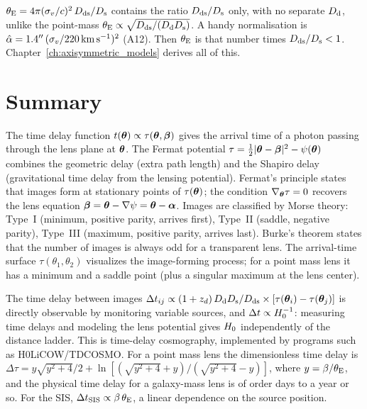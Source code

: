 \begin{annotation}
$\theta_{\mathrm{E}} = 4\pi(\sigma_v/c)^2\,D_{\mathrm{ds}}/D_{\mathrm{s}}$ contains the ratio
$D_{\mathrm{ds}}/D_{\mathrm{s}}$ only, with no separate $D_{\mathrm{d}}$, unlike the point-mass
$\theta_{\mathrm{E}}\propto\sqrt{D_{\mathrm{ds}}/(D_{\mathrm{d}}D_{\mathrm{s}})}$.  A handy normalisation is
$\hat{\alpha} = 1.4''\,(\sigma_v/220\,\mathrm{km\,s^{-1}})^2$
\citep[eq.~44]{narayan_lectures_1997} (A12).  Then $\theta_{\mathrm{E}}$ is that number
times $D_{\mathrm{ds}}/D_{\mathrm{s}}<1$.  Chapter~\ref{ch:axisymmetric_models} derives all of this.
\end{annotation}


\section{Summary}
\label{sec:fermat_summary}

The time delay function $t(\boldsymbol{\theta}) \propto \tau(\boldsymbol{\theta}, \boldsymbol{\beta})$
gives the arrival time of a photon passing through the lens plane at
$\boldsymbol{\theta}$.  The Fermat potential
$\tau = \tfrac{1}{2}|\boldsymbol{\theta} - \boldsymbol{\beta}|^2 - \psi(\boldsymbol{\theta})$ combines the
geometric delay (extra path length) and the Shapiro delay (gravitational
time delay from the lensing potential).  Fermat's principle states that
images form at stationary points of $\tau(\boldsymbol{\theta})$; the condition
$\nabla_{\boldsymbol{\theta}}\tau = 0$ recovers the lens equation
$\boldsymbol{\beta} = \boldsymbol{\theta} - \nabla\psi = \boldsymbol{\theta} - \boldsymbol{\alpha}$.  Images are
classified by Morse theory: Type~I (minimum, positive parity, arrives
first), Type~II (saddle, negative parity), Type~III (maximum, positive
parity, arrives last).  Burke's theorem states that the number of images
is always odd for a transparent lens.  The arrival-time surface
$\tau(\theta_1, \theta_2)$ visualizes the image-forming process; for a
point mass lens it has a minimum and a saddle point (plus a singular
maximum at the lens center).

The time delay between images
$\Delta t_{ij} \propto (1+z_d)\,D_{\mathrm{d}}D_{\mathrm{s}}/D_{\mathrm{ds}} \times
[\tau(\boldsymbol{\theta}_i) - \tau(\boldsymbol{\theta}_j)]$ is directly observable by
monitoring variable sources, and $\Delta t \propto H_0^{-1}$:
measuring time delays and modeling the lens potential gives $H_0$
independently of the distance ladder.  This is time-delay cosmography,
implemented by programs such as H0LiCOW/TDCOSMO.  For a point mass lens
the dimensionless time delay is
$\Delta\tau = y\sqrt{y^2+4}/2 + \ln[(\sqrt{y^2+4}+y)/(\sqrt{y^2+4}-y)]$,
where $y = \beta/\theta_{\mathrm{E}}$, and the physical time delay for a galaxy-mass
lens is of order days to a year or so.  For the SIS,
$\Delta t_{\mathrm{SIS}} \propto \beta\,\theta_{\mathrm{E}}$, a linear dependence on
the source position.


